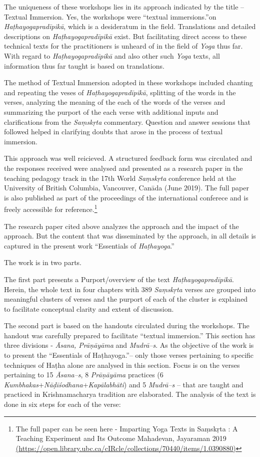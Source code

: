 The uniqueness of these workshops lies in its approach indicated by the title – Textual Immersion. Yes, the workshops were “textual immersions.”on \textit{Haṭhayogapradīpikā}, which is a desideratum in the field. Translations and detailed descriptions on \textit{Haṭhayogapradīpikā} exist. But facilitating direct access to these technical texts for the practitioners is unheard of in the field of \textit{Yoga} thus far. With regard to \textit{Haṭhayogapradīpikā} and also other such \textit{Yoga} texts, all information thus far taught is based on translations.
\smallskip

The method of Textual Immersion adopted in these workshops included chanting and repeating the veses of \textit{Haṭhayogapradīpikā}, splitting of the words in the verses, analyzing the meaning of the each of the words of the verses and summarizing the purport of the each verse with additional inputs and clarifications from the \textit{Saṃskṛta} commentary. Question and answer sessions that followed helped in clarifying doubts that arose in the process of textual immersion.
\smallskip

This approach was well reicieved. A structured feedback form was circulated and the responses received were  analysed and presented as a research paper in the teaching pedagogy track in the 17th World \textit{Saṃskṛta} conference held at the University of British Columbia, Vancouver, Canāda (June 2019). The full paper is also published as part of the proceedings of the international conferece and is freely accessible for reference.\footnote{The full paper can be seen here - Imparting Yoga Texts in Saṃskṛta : A Teaching Experiment and Its Outcome Mahadevan, Jayaraman 2019 \url{(https://open.library.ubc.ca/cIRcle/collections/70440/items/1.0390880)}}
\smallskip

The research paper cited above analyzes the approach and the impact of the approach. But the content that was disseminated by the approach, in all details is captured in the present work “Essentials of \textit{Haṭhayoga}.”

The work is in two parts.

The first part presents a Purport/overview of the text \textit{Haṭhayogapradīpikā}. Herein, the whole text in four chapters with 389 \textit{Saṃskṛta} verses are grouped into meaningful clusters of verses and the purport of each of the cluster is explained to facilitate conceptual clarity and extent of discussion.

The second part is based on the handouts circulated during the workshops. The handout was carefully prepared to facilitate “textual immersion.” This section has three divisions - \textit{Āsana, Prāṇāyāma} and \textit{Mudrā–s}. As the objective of the work is to present the “Essentials of Haṭhayoga.”– only those verses pertaining to specific techniques of Haṭha alone are analysed in this section. Focus is on the verses pertaining to 15 \textit{Āsana–s}, 8 \textit{Prāṇāyāma} practices (6 \textit{Kumbhakas}+\textit{Nāḍīśodhana}+\textit{Kapālabhāti}) and 5 \textit{Mudrā–s} – that are taught and practiced in Krishnamacharya tradition are elaborated. The analysis of the text is done in six steps for each of the verse:

